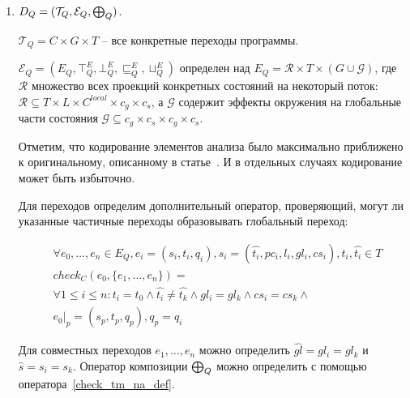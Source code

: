 
\begin{enumerate}

\item $D_Q=(\mathcal{T}_Q, \mathcal{E}_Q, \mathrel{\bigoplus}_Q)$.

$\mathcal{T}_Q=C \times G \times T$ -- все конкретные переходы программы.

$\mathcal{E}_Q=(E_Q, \top^E_Q, \bot^E_Q, \sqsubseteq^E_Q, \sqcup^E_Q)$ определен над $E_Q=\mathcal{R} \times T \times (G \cup \mathcal{G})$, где
$\mathcal{R}$ множество всех проекций конкретных состояний на некоторый поток:
$\mathcal{R} \subseteq T\times L\times C^{local} \times c_g \times c_s$, а 
$\mathcal{G}$ содержит эффекты окружения на глобальные части состояния
$\mathcal{G} \subseteq c_g \times c_s \times c_g \times c_s$.

Отметим, что кодирование элементов анализа было максимально приближено к оригинальному, описанному в статье~\cite{ThreadModular03}.
И в отдельных случаях кодирование может быть избыточно.

Для переходов определим дополнительный оператор, проверяющий, могут ли указанные частичные переходы образовывать глобальный переход:

\begin{equation}
\label{check_tm_na_def}
\begin{aligned}
& \forall e_0, \dots, e_n \in E_Q, e_i = (s_i, t_i, q_i), s_i=(\widehat{t_i},pc_i,l_i,gl_i,cs_i), t_i, \widehat{t_i} \in T\\
& check_C(e_0, \{e_1, \dots, e_n\}) = \\
& \forall 1 \le i \le n: t_i = t_0 \land \widehat{t_i} \ne \widehat{t_k} \land gl_i=gl_k \land cs_i=cs_k  \land \\
& e_0|_p = (s_p, t_p, q_p), q_p = q_i
\end{aligned}
\end{equation}

Для совместных переходов $e_1,\dots,e_n$ можно определить $\widehat{gl}=gl_i=gl_k$ и $\widehat{s}=s_i=s_k$.
Оператор композиции $\mathrel{\bigoplus}_Q$ можно определить с помощью оператора~\ref{check_tm_na_def}.


\end{enumerate}
